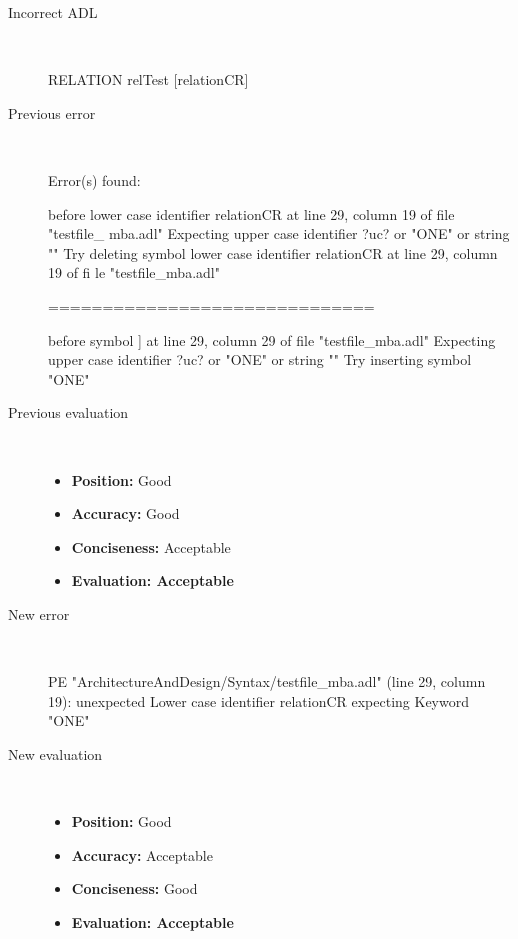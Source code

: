 \begin{description}
  \item[Incorrect ADL]~\\
\begin{adl}
RELATION relTest [relationCR]\end{adl}
  \item[Previous error]~\\
\begin{haskell}
Error(s) found:

before lower case identifier relationCR at line 29, column 19 of file "testfile_
mba.adl"
Expecting upper case identifier ?uc? or "ONE" or string ""
Try deleting symbol lower case identifier relationCR at line 29, column 19 of fi
le "testfile_mba.adl"

==============================

before symbol ] at line 29, column 29 of file "testfile_mba.adl"
Expecting upper case identifier ?uc? or "ONE" or string ""
Try inserting symbol "ONE"
\end{haskell}
  \item[Previous evaluation]~\\
    \begin{itemize}
    \item \textbf{Position:} Good
    \item \textbf{Accuracy:} Good
    \item \textbf{Conciseness:} Acceptable
    \item \textbf{Evaluation: Acceptable}
    \end{itemize}
  \item[New error]~\\
\begin{haskell}
PE "ArchitectureAndDesign/Syntax/testfile_mba.adl" (line 29, column 19):
unexpected Lower case identifier relationCR
expecting Keyword "ONE"\end{haskell}
  \item[New evaluation]~\\
    \begin{itemize}
    \item \textbf{Position:} Good
    \item \textbf{Accuracy:} Acceptable
    \item \textbf{Conciseness:} Good
    \item \textbf{Evaluation: Acceptable}
    \end{itemize}
  \end{description}


